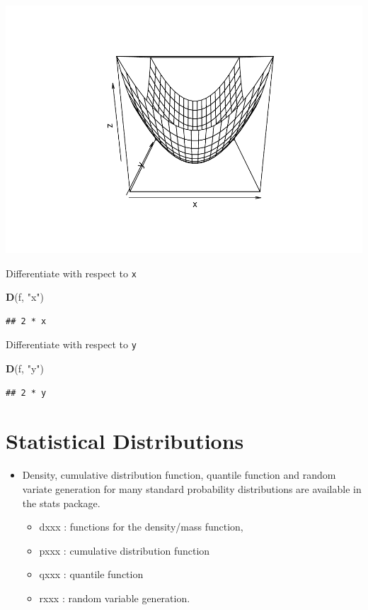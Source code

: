\documentclass[
]{book}
\newenvironment{Shaded}{\begin{snugshade}}{\end{snugshade}}
\newcommand{\FunctionTok}[1]{\textcolor[rgb]{0.13,0.29,0.53}{\textbf{#1}}}
\newcommand{\NormalTok}[1]{#1}
\newcommand{\StringTok}[1]{\textcolor[rgb]{0.31,0.60,0.02}{#1}}
\providecommand{\tightlist}{%
  \setlength{\itemsep}{0pt}\setlength{\parskip}{0pt}}
\begin{document}
\includegraphics{bookdown-demo_files/figure-latex/unnamed-chunk-11-1.pdf}

Differentiate with respect to \texttt{x}

\begin{Shaded}
\begin{Highlighting}[]
\FunctionTok{D}\NormalTok{(f, }\StringTok{"x"}\NormalTok{)}
\end{Highlighting}
\end{Shaded}

\begin{verbatim}
## 2 * x
\end{verbatim}

Differentiate with respect to \texttt{y}

\begin{Shaded}
\begin{Highlighting}[]
\FunctionTok{D}\NormalTok{(f, }\StringTok{"y"}\NormalTok{)}
\end{Highlighting}
\end{Shaded}

\begin{verbatim}
## 2 * y
\end{verbatim}

\hypertarget{statistical-distributions}{%
\chapter{Statistical Distributions}\label{statistical-distributions}}

\begin{itemize}
\item
  Density, cumulative distribution function, quantile function and random variate generation for many standard probability distributions are available in the stats package.

  \begin{itemize}
  \tightlist
  \item
    dxxx : functions for the density/mass function,
  \item
    pxxx : cumulative distribution function
  \item
    qxxx : quantile function
  \item
    rxxx : random variable generation.
  \end{itemize}
\end{itemize}
\end{document}

